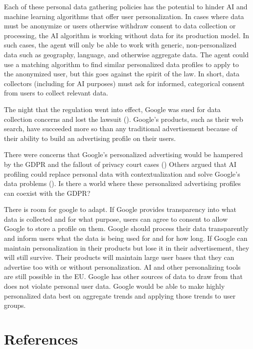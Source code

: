 \documentclass[
	letterpaper, %
]{jdf}
\begin{document}
Each of these personal data gathering policies has the potential to hinder AI and machine learning algorithms that offer user personalization. In cases where data must be anonymize or users otherwise withdraw consent to data collection or processing, the AI algorithm is working without data for its production model. In such cases, the agent will only be able to work with generic, non-personalized data such as geography, language, and otherwise aggregate data. The agent could use a matching algorithm to find similar personalized data profiles to apply to the anonymized user, but this goes against the spirit of the law. In short, data collectors (including for AI purposes) must ask for informed, categorical consent from users to collect relevant data. 

The night that the regulation went into effect, Google was sued for data collection concerns and lost the lawsuit (\cite{satariano_google_2019}). Google's products, such as their web search, have succeeded more so than any traditional advertisement because of their ability to build an advertising profile on their users.  

There were concerns that Google's personalized advertising would be hampered by the GDPR and the fallout of privacy court cases (\cite{barry_gdpr_2019}) Others argued that AI profiling could replace personal data with contextualization and solve Google's data problems (\cite{davies_personalization_2018}). Is there a world where these personalized advertising profiles can coexist with the GDPR?  

There is room for google to adapt. If Google provides transparency into what data is collected and for what purpose, users can agree to consent to allow Google to store a profile on them. Google should process their data transparently and inform users what the data is being used for and for how long. If Google can maintain personalization in their products but lose it in their advertisement, they will still survive. Their products will maintain large user bases that they can advertise too with or without personalization. AI and other personalizing tools are still possible in the EU. Google has other sources of data to draw from that does not violate personal user data. Google would be able to make highly personalized data best on aggregate trends and applying those trends to user groups. 

\section{References}
\printbibliography[heading=none]
\end{document}
